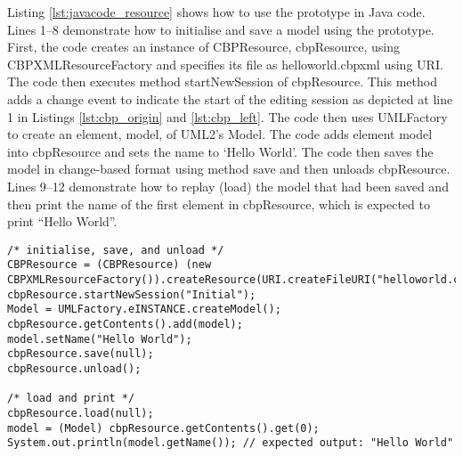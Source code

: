 Listing \ref{lst:javacode_resource} shows how to use the prototype in Java code. Lines 1–8 demonstrate how to initialise and save a model using the prototype. First, the code creates an instance of \textsf{CBPResource}, \textsf{cbpResource}, using \textsf{CBPXMLResourceFactory} and specifies its file as \textsf{helloworld.cbpxml} using \textsf{URI}. The code then executes method \textsf{startNewSession} of \textsf{cbpResource}. This method adds a change event to indicate the start of the editing session as depicted at line 1 in Listings \ref{lst:cbp_origin} and \ref{lst:cbp_left}.
The code then uses \textsf{UMLFactory} to create an element, \textsf{model}, of UML2’s \textsf{Model}. The code adds element \textsf{model} into \textsf{cbpResource} and sets the name to ‘Hello World’. The code then saves the model in change-based format using method \textsf{save} and then unloads \textsf{cbpResource}. Lines 9–12 demonstrate how to replay (load) the model that had been saved and then print the name of the first element in \textsf{cbpResource}, which is expected to print “Hello World”.

\vspace{-20pt}
\begin{lstlisting}[style=java,caption={An example how to use \textsf{CBPResource} in Java code.},label=lst:javacode_resource]
/* initialise, save, and unload */
CBPResource = (CBPResource) (new CBPXMLResourceFactory()).createResource(URI.createFileURI("helloworld.cbpxml"));
cbpResource.startNewSession("Initial");
Model = UMLFactory.eINSTANCE.createModel();
cbpResource.getContents().add(model);
model.setName("Hello World");
cbpResource.save(null);
cbpResource.unload();

/* load and print */
cbpResource.load(null);
model = (Model) cbpResource.getContents().get(0);
System.out.println(model.getName()); // expected output: "Hello World"
\end{lstlisting}


